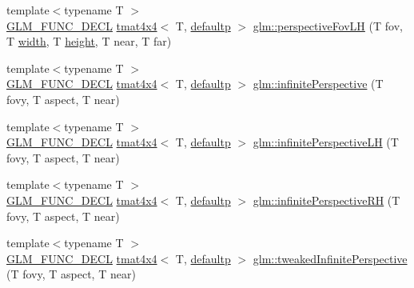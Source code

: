 \begin{DoxyCompactItemize}
\item 
{\footnotesize template$<$typename T $>$ }\\\mbox{\hyperlink{setup_8hpp_ab2d052de21a70539923e9bcbf6e83a51}{G\+L\+M\+\_\+\+F\+U\+N\+C\+\_\+\+D\+E\+CL}} \mbox{\hyperlink{structglm_1_1tmat4x4}{tmat4x4}}$<$ T, \mbox{\hyperlink{namespaceglm_a0f04f086094c747d227af4425893f545a9d21ccd8b5a009ec7eb7677befc3bf51}{defaultp}} $>$ \mbox{\hyperlink{group__gtc__matrix__transform_gae705a2f19c3ef5ef880bd6c92759cf2d}{glm\+::perspective\+Fov\+LH}} (T fov, T \mbox{\hyperlink{glad_8h_a09012ea95ebbbe1c032db7c68b54291e}{width}}, T \mbox{\hyperlink{glad_8h_a456943498a720df0f4b62bafa5dad93c}{height}}, T near, T far)
\item 
{\footnotesize template$<$typename T $>$ }\\\mbox{\hyperlink{setup_8hpp_ab2d052de21a70539923e9bcbf6e83a51}{G\+L\+M\+\_\+\+F\+U\+N\+C\+\_\+\+D\+E\+CL}} \mbox{\hyperlink{structglm_1_1tmat4x4}{tmat4x4}}$<$ T, \mbox{\hyperlink{namespaceglm_a0f04f086094c747d227af4425893f545a9d21ccd8b5a009ec7eb7677befc3bf51}{defaultp}} $>$ \mbox{\hyperlink{group__gtc__matrix__transform_ga79f704ad91a5f0d68abd88c66c8186e5}{glm\+::infinite\+Perspective}} (T fovy, T aspect, T near)
\item 
{\footnotesize template$<$typename T $>$ }\\\mbox{\hyperlink{setup_8hpp_ab2d052de21a70539923e9bcbf6e83a51}{G\+L\+M\+\_\+\+F\+U\+N\+C\+\_\+\+D\+E\+CL}} \mbox{\hyperlink{structglm_1_1tmat4x4}{tmat4x4}}$<$ T, \mbox{\hyperlink{namespaceglm_a0f04f086094c747d227af4425893f545a9d21ccd8b5a009ec7eb7677befc3bf51}{defaultp}} $>$ \mbox{\hyperlink{group__gtc__matrix__transform_ga47af534da2b28effa4c7945ec82ccd9d}{glm\+::infinite\+Perspective\+LH}} (T fovy, T aspect, T near)
\item 
{\footnotesize template$<$typename T $>$ }\\\mbox{\hyperlink{setup_8hpp_ab2d052de21a70539923e9bcbf6e83a51}{G\+L\+M\+\_\+\+F\+U\+N\+C\+\_\+\+D\+E\+CL}} \mbox{\hyperlink{structglm_1_1tmat4x4}{tmat4x4}}$<$ T, \mbox{\hyperlink{namespaceglm_a0f04f086094c747d227af4425893f545a9d21ccd8b5a009ec7eb7677befc3bf51}{defaultp}} $>$ \mbox{\hyperlink{group__gtc__matrix__transform_ga79575023763df88dff1bf8255a42d0be}{glm\+::infinite\+Perspective\+RH}} (T fovy, T aspect, T near)
\item 
{\footnotesize template$<$typename T $>$ }\\\mbox{\hyperlink{setup_8hpp_ab2d052de21a70539923e9bcbf6e83a51}{G\+L\+M\+\_\+\+F\+U\+N\+C\+\_\+\+D\+E\+CL}} \mbox{\hyperlink{structglm_1_1tmat4x4}{tmat4x4}}$<$ T, \mbox{\hyperlink{namespaceglm_a0f04f086094c747d227af4425893f545a9d21ccd8b5a009ec7eb7677befc3bf51}{defaultp}} $>$ \mbox{\hyperlink{group__gtc__matrix__transform_gaed64bd81f5ecdab52fecbdf7f6b58194}{glm\+::tweaked\+Infinite\+Perspective}} (T fovy, T aspect, T near)

\end{DoxyCompactItemize}
